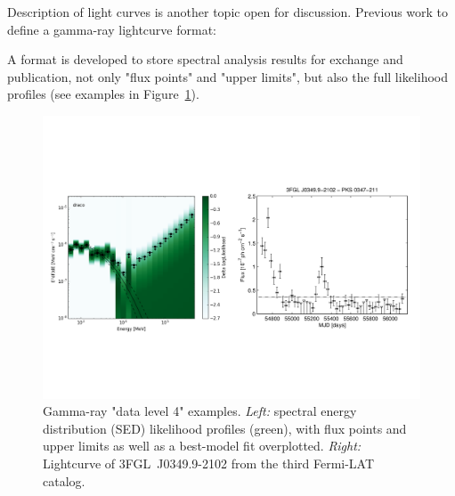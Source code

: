 Description of light curves is another topic open for discussion. 
Previous work to define a gamma-ray lightcurve format: \cite{2010AnA...524A..48T}

A format is developed to store spectral analysis results for exchange and publication, not only "flux points" and "upper limits", but also the full likelihood profiles (see examples in Figure~\ref{fig:dl4-examples}).

\begin{figure}[tb]
\centerline{\includegraphics[width=\textwidth]{figures/dl4-examples}}
\caption{
Gamma-ray "data level 4" examples. \emph{Left:} spectral energy distribution (SED) likelihood profiles (green), with flux points and upper limits as well
as a best-model fit overplotted. \emph{Right:} Lightcurve of 3FGL~J0349.9-2102 from the third Fermi-LAT catalog.
}
\label{fig:dl4-examples}
\end{figure}
